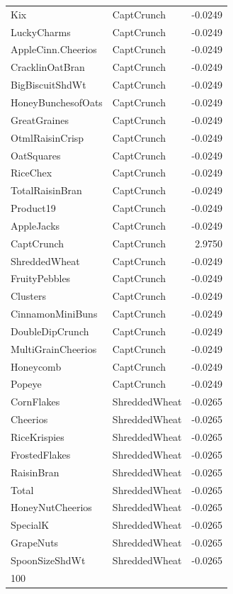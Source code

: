 \begin{longtable}{llr}
Kix & CaptCrunch & -0.0249 \\
LuckyCharms & CaptCrunch & -0.0249 \\
AppleCinn.Cheerios & CaptCrunch & -0.0249 \\
CracklinOatBran & CaptCrunch & -0.0249 \\
BigBiscuitShdWt & CaptCrunch & -0.0249 \\
HoneyBunchesofOats & CaptCrunch & -0.0249 \\
GreatGraines & CaptCrunch & -0.0249 \\
OtmlRaisinCrisp & CaptCrunch & -0.0249 \\
OatSquares & CaptCrunch & -0.0249 \\
RiceChex & CaptCrunch & -0.0249 \\
TotalRaisinBran & CaptCrunch & -0.0249 \\
Product19 & CaptCrunch & -0.0249 \\
AppleJacks & CaptCrunch & -0.0249 \\
CaptCrunch & CaptCrunch & 2.9750 \\
ShreddedWheat & CaptCrunch & -0.0249 \\
FruityPebbles & CaptCrunch & -0.0249 \\
Clusters & CaptCrunch & -0.0249 \\
CinnamonMiniBuns & CaptCrunch & -0.0249 \\
DoubleDipCrunch & CaptCrunch & -0.0249 \\
MultiGrainCheerios & CaptCrunch & -0.0249 \\
Honeycomb & CaptCrunch & -0.0249 \\
Popeye & CaptCrunch & -0.0249 \\
CornFlakes & ShreddedWheat & -0.0265 \\
Cheerios & ShreddedWheat & -0.0265 \\
RiceKrispies & ShreddedWheat & -0.0265 \\
FrostedFlakes & ShreddedWheat & -0.0265 \\
RaisinBran & ShreddedWheat & -0.0265 \\
Total & ShreddedWheat & -0.0265 \\
HoneyNutCheerios & ShreddedWheat & -0.0265 \\
SpecialK & ShreddedWheat & -0.0265 \\
GrapeNuts & ShreddedWheat & -0.0265 \\
SpoonSizeShdWt & ShreddedWheat & -0.0265 \\
100%

\end{longtable}
